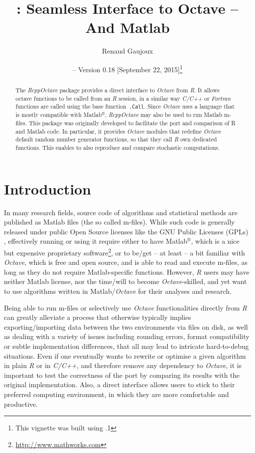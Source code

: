 \documentclass[english,10pt,a4paper]{article}\usepackage[]{graphicx}\usepackage[]{color}
\author{Renaud Gaujoux}
\title{\pkgname{RcppOctave}: Seamless Interface to Octave -- And Matlab}
\date{\Rpkg{RcppOctave} -- Version 0.18
[September 22, 2015]\footnote{This vignette was built using \octave
3.8.1}}
\newcommand{\matlab}{Matlab$^\circledR$\xspace}
\let\proglang=\textit
\let\code=\texttt
\newcommand{\pkgname}[1]{\textit{#1}\xspace}
\newcommand{\Rpkg}[1]{\pkgname{#1} package\xspace}
\newcommand{\R}{\proglang{R}\xspace}
\newcommand{\octave}{\proglang{Octave}\xspace}
\begin{document}
\maketitle

\begin{abstract}
The \Rpkg{RcppOctave} provides a direct interface to \octave from
\R.
It allows \\octave functions to be called from an \R session,
in a similar way \proglang{C/C++} or \proglang{Fortran} functions are called using the base function~\code{.Call}.
Since \octave uses a language that is mostly compatible with \matlab,
\pkgname{RcppOctave} may also be used to run Matlab m-files.
This package was originally developed to facilitate the port and comparison of R
and Matlab code.
In particular, it provides \octave modules that redefine
\octave default random number generator functions, so that they call
\proglang{R} own dedicated functions.
This enables to also reproduce and compare stochastic computations.
\end{abstract}

\noindent\hrulefill
\tableofcontents
\noindent\hrulefill

\section{Introduction}

In many research fields, source code of algorithms and statistical methods are
published as Matlab files (the so called m-files).
While such code is generally released under public Open Source licenses like the
GNU Public Licenses (GPLs) \cite{gnuGPL}, effectively running or using it
require either to have \matlab, which is a nice but expensive proprietary
software\footnote{\url{http://www.mathworks.com}}, or to be/get -- at least -- a bit familiar with \octave \cite{Eaton2002}, which is free and open source, and is able to read and execute m-files, as long as they do not require Matlab-specific functions.
However, \proglang{R} users may have neither Matlab license, nor the
time/will to become \octave-skilled, and yet want to use algorithms written in
Matlab/\octave for their analyses and research.

Being able to run m-files or selectively use \octave functionalities
directly from \proglang{R} can greatly alleviate a process that otherwise
typically implies exporting/importing data between the two environments via
files on disk, as well as dealing with a variety of issues including
rounding errors, format compatibility or subtle implementation differences,
that all may lead to intricate hard-to-debug situations.
Even if one eventually wants to rewrite or optimise a given algorithm in plain
\proglang{R} or in \proglang{C/C++}, and therefore remove any dependency to
\octave, it is important to test the correctness of the port by
comparing its results with the original implementation.
Also, a direct interface allows users to stick to their preferred computing
environment, in which they are more comfortable and productive.
\end{document}
